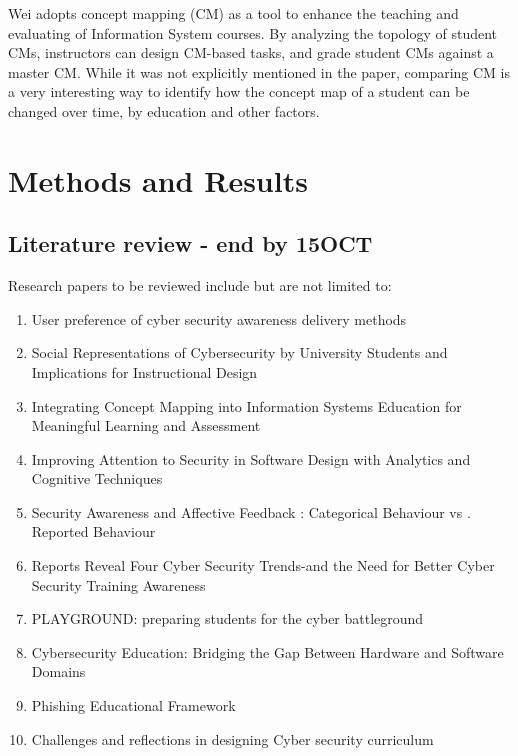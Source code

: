 \documentclass[conference]{IEEEtran}
\begin{document}
Wei \cite{Wei2017IntegratingAssessment} adopts concept mapping (CM) as a tool to enhance the teaching and evaluating of Information System courses. By analyzing the topology of student CMs, instructors can design CM-based tasks, and grade student CMs against a master CM. While it was not explicitly mentioned in the paper, comparing CM is a very interesting way to identify how the concept map of a student can be changed over time, by education and other factors.


\section{Methods and Results}
\subsection{Literature review - end by 15OCT}
Research papers to be reviewed include but are not limited to:
\begin{enumerate}
\item User preference of cyber security awareness delivery methods \cite{Abawajy2014UserMethods}
\item Social Representations of Cybersecurity by University Students and Implications for Instructional Design \cite{Pawlowski2016SocialDesign}
\item Integrating Concept Mapping into Information Systems Education for Meaningful Learning and Assessment \cite{Wei2017IntegratingAssessment}
\item Improving Attention to Security in Software Design with Analytics and Cognitive Techniques \cite{Whitmore2017ImprovingTechniques}\
\item Security Awareness and Affective Feedback : Categorical Behaviour vs . Reported Behaviour \cite{ShepherdSecurityBehaviour}
\item Reports Reveal Four Cyber Security Trends-and the Need for Better Cyber Security Training Awareness \cite{Supra2016ReportsAwareness}
\item PLAYGROUND: preparing students for the cyber battleground \cite{Nielson2017PLAYGROUND:Battleground}
\item Cybersecurity Education: Bridging the Gap Between Hardware and Software Domains \cite{Lukowiak2014CybersecurityDomains}
\item Phishing Educational Framework \cite{RakhraAsstPHISHINGKaur}
\item Challenges and reflections in designing Cyber security curriculum \cite{Pereira2017ChallengesCurriculum}
\end{enumerate}
\end{document}
